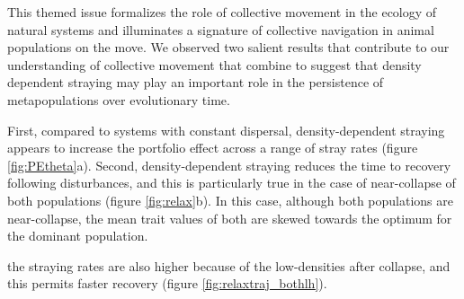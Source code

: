 \documentclass[twocolumn,preprintnumbers,amsmath,amssymb,superscriptaddress]{revtex4}
\begin{document}
This themed issue formalizes the role of collective movement in the ecology of natural systems and illuminates a signature of collective navigation in animal populations on the move.
We observed two salient results that contribute to our understanding of collective movement that combine to suggest that density dependent straying may play an important role in the persistence of metapopulations over evolutionary time.


First, compared to systems with constant dispersal, density-dependent straying appears to increase the portfolio effect across a range of stray rates (figure \ref{fig:PEtheta}a). 
Second, density-dependent straying reduces the time to recovery following disturbances, and this is particularly true in the case of near-collapse of both populations (figure \ref{fig:relax}b).
In this case, although both populations are near-collapse, the mean trait values of both are skewed towards the optimum for the dominant population.

 the straying rates are also higher because of the low-densities after collapse, and this permits faster recovery (figure \ref{fig:relaxtraj_bothlh}).



\end{document}

